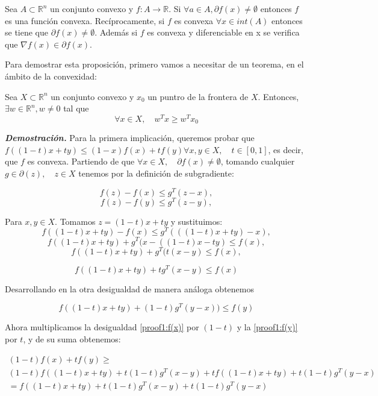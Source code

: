 \begin{proposicion}
\label{prop:subgrad}
    Sea $A \subset \mathbb{R}^n$ un conjunto convexo y $f:A \rightarrow \mathbb{R}$. Si $\forall a \in A, \partial f(x) \neq \emptyset$ entonces $f$ es una función convexa. Recíprocamente, si $f$ es convexa $\forall x \in int(A)$ entonces se tiene que $\partial f(x) \neq \emptyset$. Además si $f$ es convexa y diferenciable en x se verifica que $\nabla f(x) \in \partial f(x)$.
\end{proposicion}

Para demostrar esta proposición, primero vamos a necesitar de un teorema, en el ámbito de la convexidad:

\begin{teorema}
    Sea $X \subset \mathbb{R}^n$ un conjunto convexo y $x_0$ un puntro de la frontera de $X$. Entonces, $\exists w \in \mathbb{R}^n, w \neq 0$ tal que
    $$\forall x \in X, \quad w^Tx \geq w^T x_0$$
\end{teorema}

\textbf{\textit{Demostración.}}
Para la primera implicación, queremos probar que $f((1-t)x+ty) \leq (1-x)f(x)+tf(y) \forall x,y \in X, \quad t \in [0,1]$, es decir, que $f$ es convexa. Partiendo de que $\forall x \in X, \quad \partial f(x) \neq \emptyset $, tomando cualquier $g \in \partial(z), \quad z \in X$ tenemos por la definición de subgradiente:

$$f(z) - f(x) \leq g^T(z-x),$$
$$f(z) - f(y) \leq g^T(z-y),$$

Para $x,y \in X$. Tomamos $z=(1-t)x + ty$ y sustituimos:
$$f((1-t)x + ty) - f(x) \leq g^T(((1-t)x + ty)-x),$$
$$f((1-t)x + ty) + g^T(x - ((1-t)x-ty) \leq f(x),$$
$$f((1-t)x + ty) + g^T(t(x-y) \leq f(x),$$

\begin{equation}\label{proof1:f(x)}
    f((1-t)x + ty) + tg^T(x-y) \leq f(x)
\end{equation}

Desarrollando en la otra desigualdad de manera análoga obtenemos

\begin{equation}\label{proof1:f(y)}
    f((1-t)x + ty) + (1-t)g^T(y-x)) \leq f(y)
\end{equation}

Ahora multiplicamos la desigualdad \ref{proof1:f(x)} por $(1-t)$ y la \ref{proof1:f(y)} por $t$, y de su suma obtenemos:

\begin{gather*}
(1-t)f(x) + tf(y) \geq \\
 (1-t)f((1-t)x+ty) + t(1-t)g^T(x-y) + tf((1-t)x+ty) + t(1-t)g^T(y-x) \\
 = f((1-t)x + ty) + t(1-t) g^T(x-y) + t(1-t)g^T(y-x)
\end{gather*}

